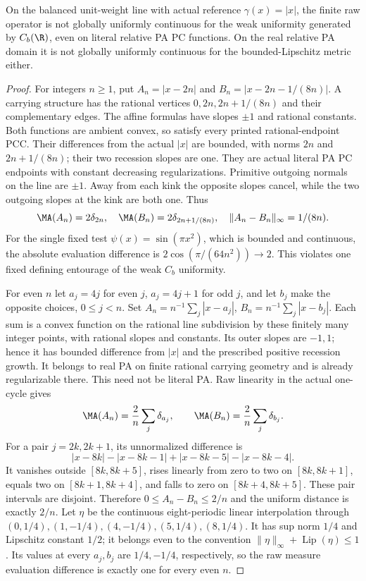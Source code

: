 \begin{theorem}\label{uniform-failure}
On the balanced unit-weight line with actual reference $\gamma(x)=|x|$,
the finite raw operator is not globally uniformly continuous for the weak
uniformity generated by $C_b(\R)$, even on literal relative PA PC functions.
On the real relative PA domain it is not globally uniformly continuous
for the bounded-Lipschitz metric either.
\end{theorem}
\begin{proof}
For integers $n\geq1$, put $A_n=|x-2n|$ and
$B_n=|x-2n-1/(8n)|$. A carrying structure has the rational vertices
$0,2n,2n+1/(8n)$ and their complementary edges. The affine formulas
have slopes $\pm1$ and rational constants. Both functions are ambient
convex, so satisfy every printed rational-endpoint PCC. Their differences
from the actual $|x|$ are bounded, with norms $2n$ and $2n+1/(8n)$;
their two recession slopes are one. They are actual literal PA PC
endpoints with constant decreasing regularizations. Primitive outgoing
normals on the line are $\pm1$. Away from each kink the opposite slopes
cancel, while the two outgoing slopes at the kink are both one. Thus
\[
 \MA(A_n)=2\delta_{2n},\quad \MA(B_n)=2\delta_{2n+1/(8n)},\quad
 \|A_n-B_n\|_\infty=1/(8n).
\]
For the single fixed test $\psi(x)=\sin(\pi x^2)$, which is bounded
and continuous, the absolute evaluation difference is
$2\cos(\pi/(64n^2))\to2$. This violates one fixed defining entourage
of the weak $C_b$ uniformity.

For even $n$ let $a_j=4j$ for even $j$, $a_j=4j+1$ for odd $j$,
and let $b_j$ make the opposite choices, $0\leq j<n$. Set
$A_n=n^{-1}\sum_j|x-a_j|$, $B_n=n^{-1}\sum_j|x-b_j|$.
Each sum is a convex function on the rational line subdivision by these
finitely many integer points, with rational slopes and constants. Its
outer slopes are $-1,1$; hence it has bounded difference from $|x|$
and the prescribed positive recession growth. It belongs to real PA on
finite rational carrying geometry and is already regularizable there.
This need not be literal PA. Raw linearity in the actual one-cycle gives
\[
 \MA(A_n)=\frac2n\sum_j\delta_{a_j},\qquad
 \MA(B_n)=\frac2n\sum_j\delta_{b_j}.
\]
For a pair $j=2k,2k+1$, its unnormalized difference is
\[
 |x-8k|-|x-8k-1|+|x-8k-5|-|x-8k-4|.
\]
It vanishes outside $[8k,8k+5]$, rises linearly from zero to two
on $[8k,8k+1]$, equals two on $[8k+1,8k+4]$, and falls to zero
on $[8k+4,8k+5]$. These pair intervals are disjoint. Therefore
$0\leq A_n-B_n\leq2/n$ and the uniform distance is exactly $2/n$.
Let $\eta$ be the continuous eight-periodic linear interpolation through
$(0,1/4),(1,-1/4),(4,-1/4),(5,1/4),(8,1/4)$.
It has sup norm $1/4$ and Lipschitz constant $1/2$; it belongs even
to the convention $\|\eta\|_\infty+\operatorname{Lip}(\eta)\leq1$.
Its values at every $a_j,b_j$ are $1/4,-1/4$, respectively, so the
raw measure evaluation difference is exactly one for every even $n$.


\end{proof}
